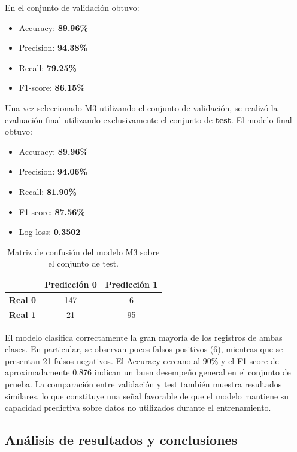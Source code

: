 \documentclass[journal]{IEEEtran}
\begin{document}
En el conjunto de validación obtuvo:
\begin{itemize}
    \item Accuracy: \textbf{89.96\%}
    \item Precision: \textbf{94.38\%}
    \item Recall: \textbf{79.25\%}
    \item F1-score: \textbf{86.15\%}
\end{itemize}

Una vez seleccionado M3 utilizando el conjunto de validación, se realizó la evaluación final utilizando exclusivamente el conjunto de \textbf{test}. El modelo final obtuvo:
\begin{itemize}
    \item Accuracy: \textbf{89.96\%}
    \item Precision: \textbf{94.06\%}
    \item Recall: \textbf{81.90\%}
    \item F1-score: \textbf{87.56\%}
    \item Log-loss: \textbf{0.3502}
\end{itemize}

\begin{table}[h]
\centering
\caption{Matriz de confusión del modelo M3 sobre el conjunto de test.}
\label{tab:confusion_matrix}
\begin{tabular}{@{}lcc@{}}
\toprule
 & \textbf{Predicción 0} & \textbf{Predicción 1} \\
\midrule
\textbf{Real 0} & 147 & 6 \\
\textbf{Real 1} & 21  & 95 \\
\bottomrule
\end{tabular}
\end{table}

El modelo clasifica correctamente la gran mayoría de los registros de ambas clases. En particular, se observan pocos falsos positivos (6), mientras que se presentan 21 falsos negativos. El Accuracy cercano al 90\% y el F1-score de aproximadamente 0.876 indican un buen desempeño general en el conjunto de prueba. La comparación entre validación y test también muestra resultados similares, lo que constituye una señal favorable de que el modelo mantiene su capacidad predictiva sobre datos no utilizados durante el entrenamiento.

\subsection{Análisis de resultados y conclusiones}
\end{document}
